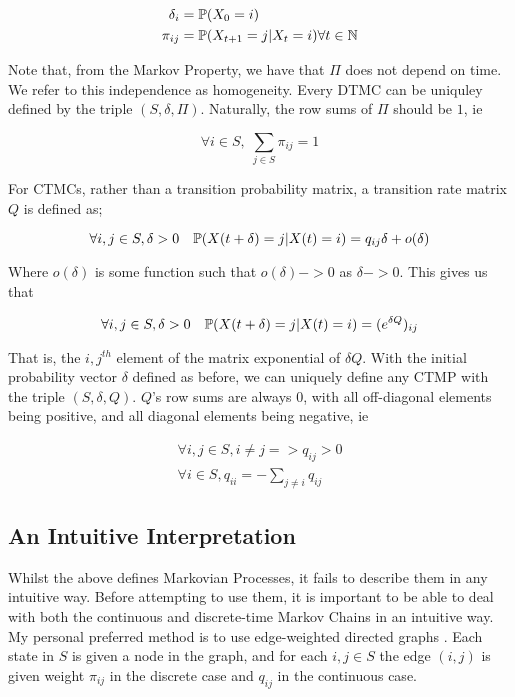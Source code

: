 \begin{align*}
\delta_i &= \mathbb{P} (X_0 = i) \\
\pi_{ij} &= \mathbb{P}(X_{t+1} = j | X_t = i) \forall t \in \mathbb{N}
\end{align*}

Note that, from the Markov Property, we have that $\Pi$ does not depend on time. We refer to this independence as homogeneity. Every DTMC can be uniquley defined by the triple $(S,\delta,\Pi)$. Naturally, the row sums of $\Pi$ should be $1$, ie

$$
\forall i \in S, \; \sum_{j \in S} \pi_{ij} = 1
$$

For CTMCs, rather than a transition probability matrix, a transition rate matrix $Q$ is defined as;

$$
\forall i,j \in S, \delta>0 \quad \mathbb{P} (X(t+\delta)=j|X(t)=i) = q_{ij}\delta + o(\delta)
$$

Where $o(\delta)$ is some function such that $o(\delta) -> 0$ as $\delta -> 0$. This gives us that

$$
\forall i,j \in S, \delta>0 \quad \mathbb{P} (X(t+\delta)=j|X(t)=i) = (e^{\delta Q})_{ij}
$$

That is, the $i,j^{th}$ element of the matrix exponential of $\delta Q$. With the initial probability vector $\delta$ defined as before, we can uniquely define any CTMP with the triple $(S,\delta,Q)$. $Q$'s row sums are always 0, with all off-diagonal elements being positive, and all diagonal elements being negative, ie

\begin{align*}
\forall i,j \in S, i \neq j => q_{ij} > 0 \\
\forall i \in S, q_{ii} = -\sum_{j \neq i} q_{ij}
\end{align*}

\subsection{An Intuitive Interpretation}

Whilst the above defines Markovian Processes, it fails to describe them in any intuitive way. Before attempting to use them, it is important to be able to deal with both the continuous and discrete-time Markov Chains in an intuitive way. My personal preferred method is to use edge-weighted directed graphs \cite{mwgraph}. Each state in $S$ is given a node in the graph, and for each $i,j \in S$ the edge $(i,j)$ is given weight $\pi_{ij}$ in the discrete case and $q_{ij}$ in the continuous case.

